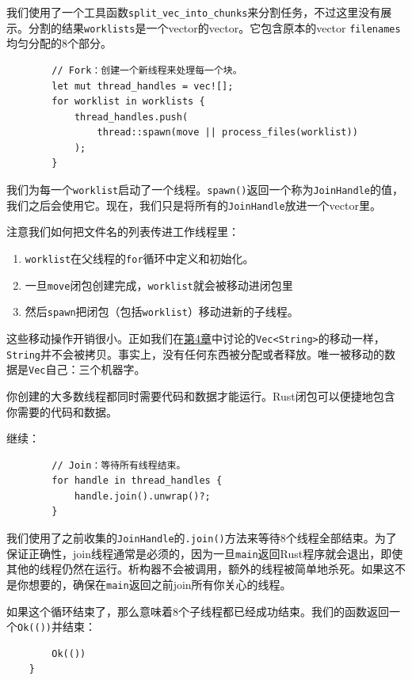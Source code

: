 我们使用了一个工具函数\texttt{split\_vec\_into\_chunks}来分割任务，不过这里没有展示。分割的结果\texttt{worklists}是一个vector的vector。它包含原本的vector \texttt{filenames}均匀分配的8个部分。

\begin{verbatim}
        // Fork：创建一个新线程来处理每一个块。
        let mut thread_handles = vec![];
        for worklist in worklists {
            thread_handles.push(
                thread::spawn(move || process_files(worklist))
            );
        }
\end{verbatim}

我们为每一个\texttt{worklist}启动了一个线程。\texttt{spawn()}返回一个称为\texttt{JoinHandle}的值，我们之后会使用它。现在，我们只是将所有的\texttt{JoinHandle}放进一个vector里。

注意我们如何把文件名的列表传进工作线程里：
\begin{enumerate}
    \item \texttt{worklist}在父线程的\texttt{for}循环中定义和初始化。
    \item 一旦\texttt{move}闭包创建完成，\texttt{worklist}就会被移动进闭包里
    \item 然后\texttt{spawn}把闭包（包括\texttt{worklist}）移动进新的子线程。
\end{enumerate}

这些移动操作开销很小。正如我们在\hyperref[ch04]{第4章}中讨论的\texttt{Vec<String>}的移动一样，\texttt{String}并不会被拷贝。事实上，没有任何东西被分配或者释放。唯一被移动的数据是\texttt{Vec}自己：三个机器字。

你创建的大多数线程都同时需要代码和数据才能运行。Rust闭包可以便捷地包含你需要的代码和数据。

继续：
\begin{verbatim}
        // Join：等待所有线程结束。
        for handle in thread_handles {
            handle.join().unwrap()?;
        }
\end{verbatim}

我们使用了之前收集的\texttt{JoinHandle}的\texttt{.join()}方法来等待8个线程全部结束。为了保证正确性，join线程通常是必须的，因为一旦\texttt{main}返回Rust程序就会退出，即使其他的线程仍然在运行。析构器不会被调用，额外的线程被简单地杀死。如果这不是你想要的，确保在\texttt{main}返回之前join所有你关心的线程。

如果这个循环结束了，那么意味着8个子线程都已经成功结束。我们的函数返回一个\texttt{Ok(())}并结束：
\begin{verbatim}
        Ok(())
    }
\end{verbatim}

